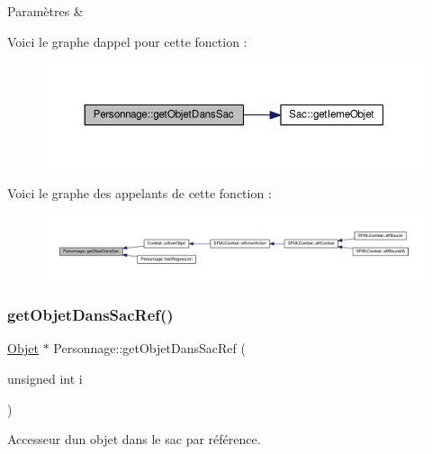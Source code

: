 \begin{DoxyParams}{Paramètres}
{\em } & \\
\hline
\end{DoxyParams}
Voici le graphe d\textquotesingle{}appel pour cette fonction \+:\nopagebreak
\begin{figure}[H]
\begin{center}
\leavevmode
\includegraphics[width=350pt]{class_personnage_a32cf123b507c36c8adbf9bd22cb0b9a2_cgraph}
\end{center}
\end{figure}
Voici le graphe des appelants de cette fonction \+:\nopagebreak
\begin{figure}[H]
\begin{center}
\leavevmode
\includegraphics[width=350pt]{class_personnage_a32cf123b507c36c8adbf9bd22cb0b9a2_icgraph}
\end{center}
\end{figure}
\mbox{\label{class_personnage_a6b3462a550a38c9e9163495c2b2015f4}} 
\subsubsection{\texorpdfstring{get\+Objet\+Dans\+Sac\+Ref()}{getObjetDansSacRef()}}
{\footnotesize\ttfamily \hyperlink{class_objet}{Objet} $\ast$ Personnage\+::get\+Objet\+Dans\+Sac\+Ref (\begin{DoxyParamCaption}\item[{unsigned int}]{i }\end{DoxyParamCaption})}



Accesseur d\textquotesingle{}un objet dans le sac par référence. 


